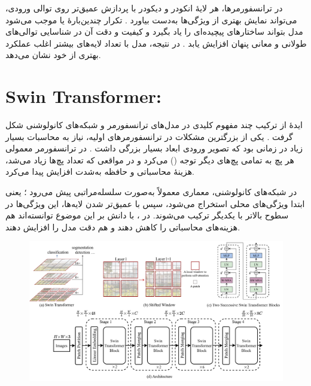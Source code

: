 در ترانسفورمرها، هر لایهٔ انکودر و دیکودر با پردازش عمیق‌تر روی توالی ورودی، می‌تواند نمایش بهتری از ویژگی‌ها به‌دست بیاورد \cite{vaswani2017attention}. تکرار چندین‌بارهٔ  یا  موجب می‌شود مدل بتواند ساختارهای پیچیده‌ای را یاد بگیرد و کیفیت و دقت آن در شناسایی توالی‌های طولانی و معانی پنهان افزایش یابد \cite{vaswani2017attention,dosovitskiy2020image}. در نتیجه، مدل با تعداد لایه‌های بیشتر اغلب عملکرد بهتری از خود نشان می‌دهد.

   
   
\section{Swin Transformer:}
ایدهٔ  از ترکیب چند مفهوم کلیدی در مدل‌های ترانسفورمر و شبکه‌های کانولوشنی شکل گرفت \cite{vaswani2017attention,he2016deep,liu2021swintransformer}.  
یکی از بزرگترین مشکلات در ترانسفورمرهای اولیه، نیاز به محاسبات بسیار زیاد در زمانی بود که تصویر ورودی ابعاد بسیار بزرگی داشت \cite{dosovitskiy2020image}. در ترانسفورمر معمولی هر پچ به تمامی پچ‌های دیگر توجه () می‌کرد و در مواقعی که تعداد پچ‌ها زیاد می‌شد، هزینهٔ محاسباتی و حافظه به‌شدت افزایش پیدا می‌کرد.

در شبکه‌های کانولوشنی، معماری معمولاً به‌صورت سلسله‌مراتبی پیش می‌رود \cite{he2016deep}؛ یعنی ابتدا ویژگی‌های محلی استخراج می‌شود، سپس با عمیق‌تر شدن لایه‌ها، این ویژگی‌ها در سطوح بالاتر با یکدیگر ترکیب می‌شوند. در  \cite{liu2021swintransformer}، با دانش بر این موضوع توانسته‌اند هم هزینه‌های محاسباتی را کاهش دهند و هم دقت مدل را افزایش دهند.

\begin{figure}[h]
	\centering
	\begin{minipage}[b]{1\textwidth}
		\centering
		\includegraphics[width=\textwidth]{transformer_images/swin_transformer.png}
		\caption{}
		\label{fig: swin transformer}
	\end{minipage}
	\hfill
\end{figure}

